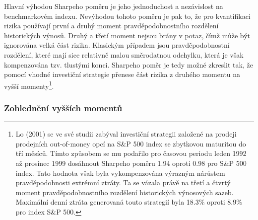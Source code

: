 \documentclass[a4paper]{book}
\begin{document}
Hlavní výhodou Sharpeho poměru je jeho jednoduchost a nezávislost na benchmarkovém indexu. Nevýhodou tohoto poměru je pak to, že pro kvantifikaci rizika používají první a druhý moment pravděpodobnostního rozdělení historických výnosů. Druhý a třetí moment nejsou brány v potaz, čímž může být ignorována velká část rizika. Klasickým případem jsou pravděpodobnostní rozdělení, které mají sice relativně malou směrodatnou odchylku, která je však kompenzována tzv. tlustými konci. Sharpeho poměr je tedy možné zkreslit tak, že pomocí vhodné investiční strategie přenese část rizika z druhého momentu na vyšší momenty\footnote{Lo (2001) se ve své studii zabýval investiční strategii založené na prodeji prodejních out-of-money opcí na S\&P 500 index se zbytkovou maturitou do tří měsíců. Tímto způsobem se mu podařilo pro časovou periodu leden 1992 až prosinec 1999 dosáhnout Sharpeho poměru 1.94 oproti 0.98 pro S\&P 500 index. Tato hodnota však byla vykompenzována výrazným nárůstem pravděpodobnosti extrémní ztráty. Ta se vázala právě na třetí a čtvrtý moment pravděpodobnostního rozdělení historických výnosových sazeb. Maximální denní ztráta generovaná touto strategií byla 18.3\% oproti 8.9\% pro index S\&P 500.}.

\subsubsection{Zohlednění vyšších momentů}
\end{document}
